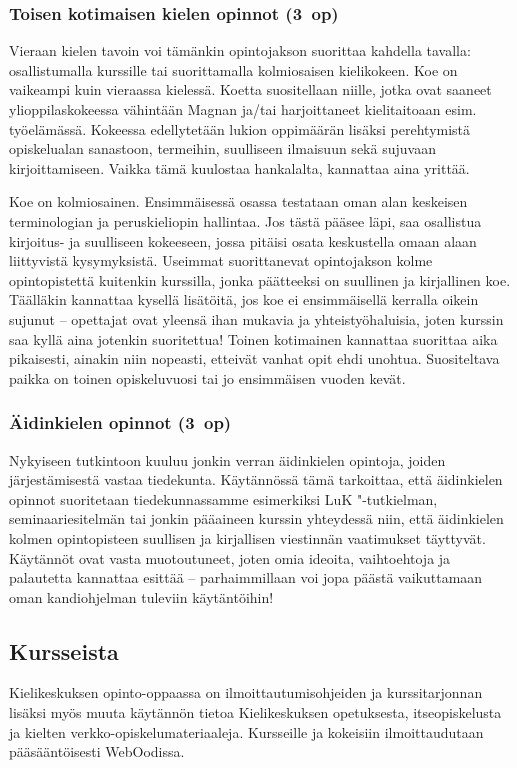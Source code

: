 \documentclass[a5paper, 8pt, twocolumn]{book} %
\numberwithin{equation}{section}
\begin{document}
\subsubsection*{Toisen kotimaisen kielen opinnot (3~op)}
Vieraan kielen tavoin voi tämänkin opintojakson
suorittaa kahdella tavalla: osallistumalla
kurssille tai suorittamalla kolmiosaisen
kielikokeen. Koe on vaikeampi
kuin vieraassa kielessä. Koetta suositellaan
niille, jotka ovat saaneet ylioppilaskokeessa
vähintään Magnan ja/tai harjoittaneet
kielitaitoaan esim.\,työelämässä. Kokeessa
edellytetään lukion oppimäärän lisäksi perehtymistä
opiskelualan sanastoon, termeihin,
suulliseen ilmaisuun sekä sujuvaan
kirjoittamiseen. Vaikka tämä kuulostaa
hankalalta, kannattaa aina yrittää.

Koe on kolmiosainen. Ensimmäisessä
osassa testataan oman alan keskeisen
terminologian ja peruskieliopin hallintaa.
Jos tästä pääsee läpi, saa osallistua kirjoitus-
ja suulliseen kokeeseen, jossa pitäisi
osata keskustella omaan alaan liittyvistä
kysymyksistä. Useimmat suorittanevat
opintojakson kolme opintopistettä kuitenkin
kurssilla, jonka päätteeksi on suullinen ja
kirjallinen koe. Täälläkin kannattaa kysellä
lisätöitä, jos koe ei ensimmäisellä kerralla
oikein sujunut -- opettajat ovat yleensä ihan
mukavia ja yhteistyöhaluisia, joten kurssin
saa kyllä aina jotenkin suoritettua! Toinen
kotimainen kannattaa suorittaa aika pikaisesti,
ainakin niin nopeasti, etteivät vanhat
opit ehdi unohtua. Suositeltava
paikka on toinen opiskeluvuosi tai jo ensimmäisen vuoden
kevät.
\subsubsection*{Äidinkielen opinnot (3~op)}
Nykyiseen tutkintoon kuuluu jonkin
verran äidinkielen opintoja, joiden järjestämisestä
vastaa tiedekunta. Käytännössä
tämä tarkoittaa, että äidinkielen opinnot
suoritetaan tiedekunnassamme esimerkiksi LuK "-tutkielman,
seminaariesitelmän tai jonkin pääaineen
kurssin yhteydessä niin, että äidinkielen kolmen
opintopisteen suullisen ja kirjallisen viestinnän
vaatimukset täyttyvät. Käytännöt
ovat vasta muotoutuneet, joten omia ideoita,
vaihtoehtoja ja palautetta kannattaa
esittää -- parhaimmillaan voi jopa päästä
vaikuttamaan oman kandiohjelman tuleviin käytäntöihin!
\subsection*{Kursseista}
Kielikeskuksen opinto-oppaassa on ilmoittautumisohjeiden
ja kurssitarjonnan lisäksi myös muuta käytännön
tietoa Kielikeskuksen opetuksesta,
itseopiskelusta ja kielten verkko-opiskelumateriaaleja.
Kursseille ja kokeisiin ilmoittaudutaan
pääsääntöisesti WebOodissa.
\end{document}
